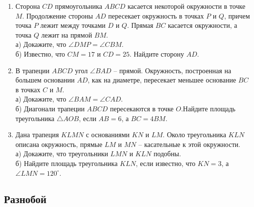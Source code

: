 \documentclass[12pt]{article}
\begin{document}
\begin{enumerate}[start=1,label={\itshape\bfseries \arabic*.}]
        \item Сторона $CD$ прямоугольника $ABCD$ касается некоторой окружности в точке $M$. Продолжение стороны $AD$ пересекает окружность в точках $P$ и $Q$, причем точка $P$ лежит между точками $D$ и $Q$. Прямая $BC$ касается окружности, а точка $Q$ лежит на прямой $BM$.\\
        а) Докажите, что $\angle DMP = \angle CBM$.\\
        б) Известно, что $CM = 17$ и $CD = 25$. Найдите сторону $AD$.


        \item В трапеции $ABCD$ угол $\angle BAD$ -- прямой. Окружность, построенная на большем основании $AD$, как на диаметре, пересекает меньшее основание $BC$ в точках $C$ и $M$.\\
        а) Докажите, что $\angle BAM = \angle CAD$.\\
        б) Диагонали трапеции $ABCD$ пересекаются в точке $O$.Найдите площадь треугольника $\triangle AOB$, если $AB = 6$, а $BC = 4BM$.


        \item Дана трапеция $KLMN$ с основаниями $KN$
        и $LM$. Около треугольника $KLN$ описана окружность, прямые $LM$ и $MN$ -- касательные к этой окружности. \\
        а) Докажите, что треугольники $LMN$ и $KLN$ подобны.\\
        б) Найдите площадь треугольника $KLN$, если известно, что $KN = 3$, а $\angle LMN = 120^{\circ}$.
 \end{enumerate}








\subsection{Разнобой}
\end{document}
